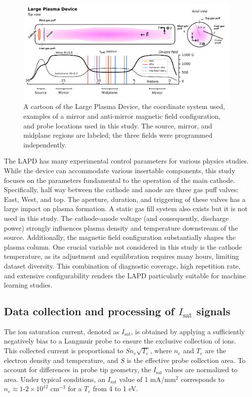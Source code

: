 \begin{figure}
	\centering
	\includegraphics[width=\textwidth]{figures/LAPD+coordinates.pdf}
	\caption[size=12]{\label{fig:LAPD_coords}A cartoon of the Large Plasma Device, the coordinate system used, examples of a mirror and anti-mirror magnetic field configuration, and probe locations used in this study. The source, mirror, and midplane regions are labeled; the three fields were programmed independently.}
\end{figure}

The LAPD has many experimental control parameters for various physics studies. While the device can accommodate various insertable components, this study focuses on the parameters fundamental to the operation of the main cathode. Specifically, half way between the cathode and anode are three gas puff valves: East, West, and top. The aperture, duration, and triggering of these valves has a large impact on plasma formation. A static gas fill system also exists but it is not used in this study. The cathode-anode voltage (and consequently, discharge power) strongly influences plasma density and temperature downstream of the source. Additionally, the magnetic field configuration substantially shapes the plasma column. One crucial variable not considered in this study is the cathode temperature, as its adjustment and equilibration requires many hours, limiting dataset diversity. This combination of diagnostic coverage, high repetition rate, and extensive configurability renders the LAPD particularly suitable for machine learning studies. 

\subsection{Data collection and processing of $I_\text{sat}$ signals}

The ion saturation current, denoted as $I_\text{sat}$, is obtained by applying a sufficiently negatively bias to a Langmuir probe to ensure the exclusive collection of ions. This collected current is proportional to $S n_e \sqrt{T_e}$, where $n_e$ and $T_e$ are the electron density and temperature, and $S$ is the effective probe collection area. To account for differences in probe tip geometry, the $I_\text{sat}$ values are normalized to area. Under typical conditions, an $I_\text{sat}$ value of 1 mA/mm$^2$ corresponds to $n_e \approx 1\text{-}2\times 10^{12}$ cm$^{-3}$ for a $T_e$ from 4 to 1 eV.

